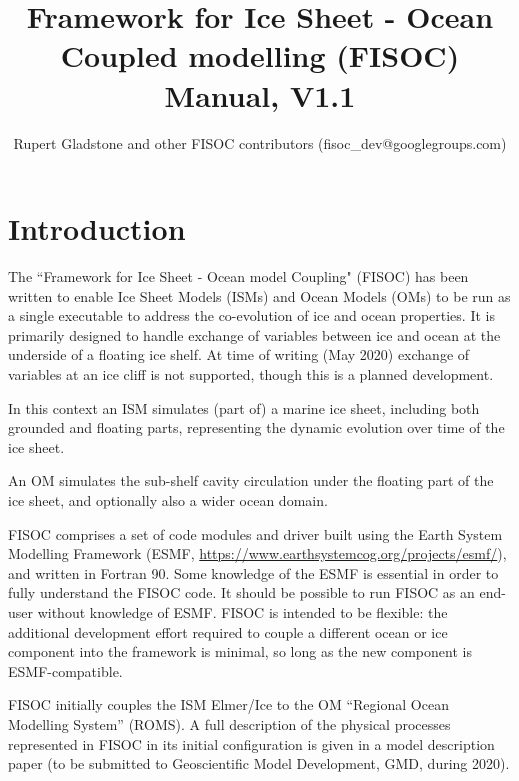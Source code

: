 \documentclass[11pt]{article}
\begin{document}
\title{Framework for Ice Sheet - Ocean Coupled modelling (FISOC) Manual, V1.1}
\author{Rupert Gladstone and other FISOC contributors  (fisoc\_dev@googlegroups.com)}

\maketitle

\newpage 
\tableofcontents
\newpage 

\section{Introduction}

The ``Framework for Ice Sheet - Ocean model Coupling" (FISOC) has been written to enable Ice Sheet Models 
(ISMs) and Ocean Models (OMs) to be run as a single executable to address the co-evolution of ice and ocean 
properties.  
It is primarily designed to handle exchange of variables between ice and ocean at the underside of a floating ice shelf.
At time of writing (May 2020) exchange of variables at an ice cliff is 
not supported, though this is a planned development.

In this context an ISM simulates (part of) a marine ice sheet, including both grounded and floating parts, 
representing the dynamic evolution over time of the ice sheet.

An OM simulates the sub-shelf cavity circulation under the floating part of the ice sheet, and optionally also 
a wider ocean domain.

FISOC comprises a set of code modules and driver built using the Earth System Modelling Framework (ESMF, 
\url{https://www.earthsystemcog.org/projects/esmf/}), and written in Fortran 90. 
Some knowledge of the ESMF is essential in order to fully understand the FISOC code.  It should 
be possible to run FISOC as an end-user without knowledge of ESMF.
FISOC is intended to be flexible: the additional development effort required to 
couple a different ocean or ice component into the framework is minimal, so 
long as the new component is ESMF-compatible. 

FISOC initially couples the ISM Elmer/Ice to the OM ``Regional Ocean Modelling System'' (ROMS).
A full description of the physical processes represented in FISOC in its 
initial configuration is given in a model description paper (to be submitted
to Geoscientific Model Development, GMD, during 2020).
\end{document}
